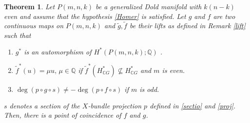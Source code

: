 \documentclass{amsart}
\newtheorem{theorem}{Theorem}[section]
\begin{document}
\begin{theorem}\label{coincidence thm under hom}
	Let $P(m,n,k)$ be a generalized Dold manifold with $k(n-k)$ even and assume that the hypothesis \eqref{Homer} is satisfied. Let $g$ and $f$ are two continuous maps on $P(m,n,k)$ and $\tilde g, \tilde f$ be their lifts as defined in  Remark \ref{lift} such %
that
	\begin{enumerate}	
		\item $g^*$ %
is an automorphism of $H^*(P(m,n,k);\mathbb Q)$%
. 
		\item $\tilde{f}^*(u) = \mu u,\, \mu \in \mathbb{Q}$ %
if $\tilde{f}^*(H^*_{\mathbb CG}) \nsubseteq H^*_{\mathbb CG}$ and $m$ is even.
		\item $\deg(p\circ g \circ s)\neq -\deg (p\circ f\circ s)$ if $m$ is odd.
	\end{enumerate}
	$s$ denotes a section of the $X$-bundle projection $p$ defined in \eqref{sectio} and \eqref{proj}. Then, there is a point of coincidence of $f$ and  $g$.
\end{theorem}
\end{document}
